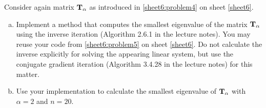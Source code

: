 \begin{Sheet}
\begin{Problem}
	Consider again matrix $\mathbf T_{\alpha}$ as introduced in \cref{sheet6:problem4} on sheet \cref{sheet6}.
	\begin{enumerate}[(a)]
		\item Implement a method that computes the smallest eigenvalue of the matrix 
		$\mathbf T_{\alpha}$ using the inverse iteration (Algorithm 2.6.1 in the
		lecture notes). You may reuse your code from \cref{sheet6:problem5} on sheet \cref{sheet6}. Do not calculate the inverse explicitly for
		solving the appearing linear system, but use the conjugate
		gradient iteration (Algorithm 3.4.28 in the lecture notes) for
		this matter.
		\item Use your implementation to calculate the smallest eigenvalue
		of $\mathbf T_{\alpha}$ with $\alpha=2$ and $n=20$.
	\end{enumerate}
\end{Problem}

  \vfill
  
  
\end{Sheet}


